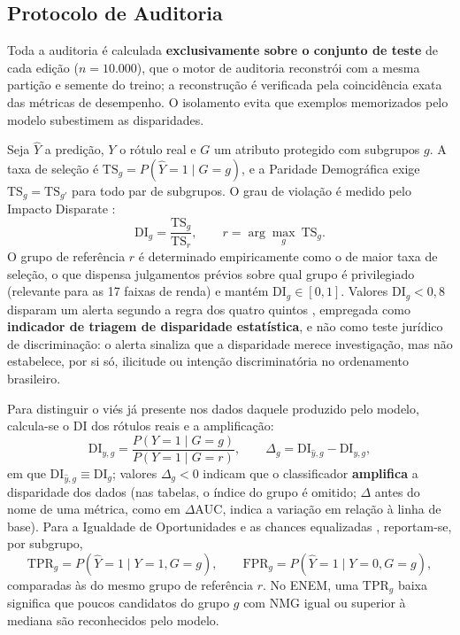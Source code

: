 \subsection{Protocolo de Auditoria}
\label{sec:metricas}

Toda a auditoria é calculada \textbf{exclusivamente sobre o conjunto de teste} de cada edição ($n = 10.000$), que o motor de auditoria reconstrói com a mesma partição e semente do treino; a reconstrução é verificada pela coincidência exata das métricas de desempenho. O isolamento evita que exemplos memorizados pelo modelo subestimem as disparidades.

Seja $\hat{Y}$ a predição, $Y$ o rótulo real e $G$ um atributo protegido com subgrupos $g$. A taxa de seleção é $\mathrm{TS}_g = P(\hat{Y} = 1 \mid G = g)$, e a Paridade Demográfica exige $\mathrm{TS}_g = \mathrm{TS}_{g'}$ para todo par de subgrupos. O grau de violação é medido pelo Impacto Disparate \cite{feldman2015certifying}:
\begin{equation}
\mathrm{DI}_g = \frac{\mathrm{TS}_g}{\mathrm{TS}_r}, \qquad r = \arg\max_{g}\ \mathrm{TS}_g.
\label{eq:di}
\end{equation}
O grupo de referência $r$ é determinado empiricamente como o de maior taxa de seleção, o que dispensa julgamentos prévios sobre qual grupo é privilegiado (relevante para as 17 faixas de renda) e mantém $\mathrm{DI}_g \in [0, 1]$. Valores $\mathrm{DI}_g < 0{,}8$ disparam um alerta segundo a regra dos quatro quintos \cite{eeoc1978uniform}, empregada como \textbf{indicador de triagem de disparidade estatística}, e não como teste jurídico de discriminação: o alerta sinaliza que a disparidade merece investigação, mas não estabelece, por si só, ilicitude ou intenção discriminatória no ordenamento brasileiro.

Para distinguir o viés já presente nos dados daquele produzido pelo modelo, calcula-se o DI dos rótulos reais e a amplificação:
\begin{equation}
\mathrm{DI}_{y,g} = \frac{P(Y=1 \mid G=g)}{P(Y=1 \mid G=r)}, \qquad \Delta_g = \mathrm{DI}_{\hat{y},g} - \mathrm{DI}_{y,g},
\label{eq:amplificacao}
\end{equation}
em que $\mathrm{DI}_{\hat{y},g} \equiv \mathrm{DI}_g$; valores $\Delta_g < 0$ indicam que o classificador \textbf{amplifica} a disparidade dos dados (nas tabelas, o índice do grupo é omitido; $\Delta$ antes do nome de uma métrica, como em $\Delta\mathrm{AUC}$, indica a variação em relação à linha de base). Para a Igualdade de Oportunidades e as chances equalizadas \cite{hardt2016equality}, reportam-se, por subgrupo,
\begin{equation}
\mathrm{TPR}_g = P(\hat{Y} = 1 \mid Y = 1, G = g), \qquad \mathrm{FPR}_g = P(\hat{Y} = 1 \mid Y = 0, G = g),
\label{eq:tpr}
\end{equation}
comparadas às do mesmo grupo de referência $r$. No ENEM, uma $\mathrm{TPR}_g$ baixa significa que poucos candidatos do grupo $g$ com NMG igual ou superior à mediana são reconhecidos pelo modelo.

